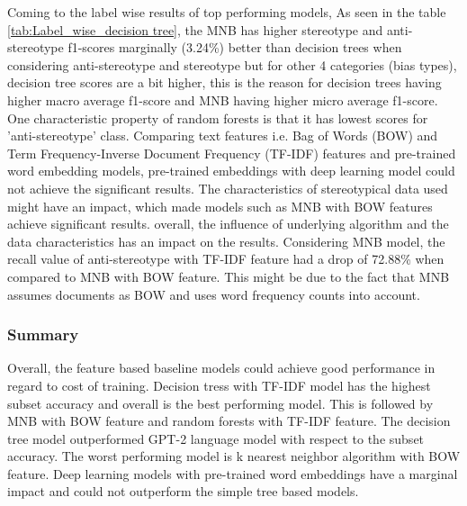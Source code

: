 Coming to the label wise results of top performing models, As seen in the table \ref{tab:Label_wise_decision tree}, the MNB has higher stereotype and anti-stereotype f1-scores marginally (3.24\%) better than decision trees when considering anti-stereotype and stereotype but for other 4 categories (bias types), decision tree scores are a bit higher, this is the reason for decision trees having higher macro average f1-score and MNB having higher micro average f1-score. One characteristic property of random forests is that it has lowest scores for 'anti-stereotype' class. Comparing text features i.e. Bag of Words (BOW) and Term Frequency-Inverse Document Frequency (TF-IDF) features and pre-trained word embedding models, pre-trained embeddings with deep learning model could not achieve the significant results. The characteristics of stereotypical data used might have an impact, which made models such as MNB with BOW features achieve significant results. overall, the influence of underlying algorithm and the data characteristics has an impact on the results. Considering MNB model, the recall value of anti-stereotype with TF-IDF feature had a drop of 72.88\% when compared to MNB with BOW feature. This might be due to the fact that MNB assumes documents as BOW and uses word frequency counts into account.

\subsubsection{Summary}
Overall, the feature based baseline models could achieve good performance in regard to cost of training. Decision tress with TF-IDF model has the highest subset accuracy and overall is the best performing model. This is followed by MNB with BOW feature and random forests with TF-IDF feature. The decision tree model outperformed GPT-2 language model with respect to the subset accuracy. The worst performing model is k nearest neighbor algorithm with BOW feature. Deep learning models with pre-trained word embeddings have a marginal impact and could not outperform the simple tree based models. 

\pagebreak


